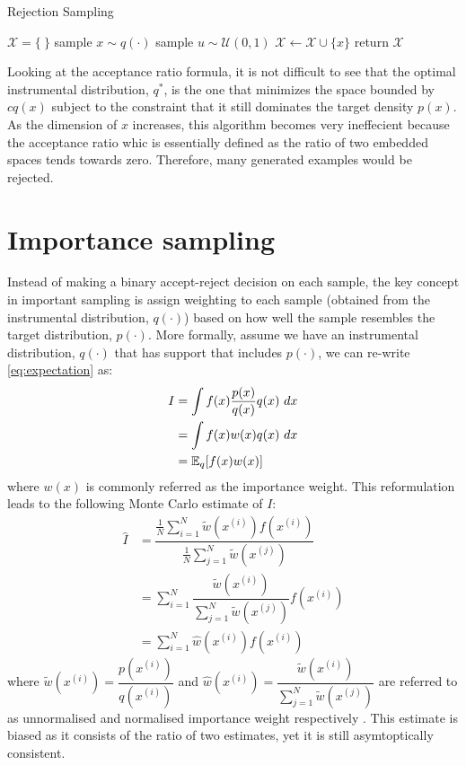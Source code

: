 \begin{algorithm}
\caption{Rejection Sampling}\label{algo:rejectionsampling}
\begin{algorithmic}[1]
\State $\mathcal{X} = \{\ \}$
\Repeat
  \State sample $x \sim q(\cdot)$
  \State sample $u \sim \mathcal{U}(0,1)$
    \State $\mathcal{X} \gets \mathcal{X} \cup \{x\}$
  \EndIf
{}
\State return $\mathcal{X}$
\EndFunction
\end{algorithmic}
\end{algorithm}

Looking at the acceptance ratio formula, it is not difficult to see that the optimal instrumental distribution, $q^*$, is the one that minimizes the space bounded by $cq(x)$ subject to the constraint that it still dominates the target density $p(x)$. As the dimension of $x$ increases, this algorithm becomes very ineffecient because the acceptance ratio whic is essentially defined as the ratio of two embedded spaces tends towards zero. Therefore, many generated examples would be rejected. 

\section{Importance sampling}
\label{sec:IS}
Instead of making a binary accept-reject decision on each sample, the key concept in important sampling is assign weighting to each sample (obtained from the instrumental distribution, $q(\cdot)$) based on how well the sample resembles the target distribution, $p(\cdot)$. More formally, assume we have an instrumental distribution, $q(\cdot)$ that has support that includes $p(\cdot)$, we can re-write \eqref{eq:expectation} as:
\begin{align}
  I &= \int f(x)\dfrac{p(x)}{q(x)}q(x)~dx \nonumber \\
    &= \int f(x)w(x)q(x)~dx \nonumber \\
    &= \operatorname{\mathbb{E}}_q[f(x)w(x)]
\end{align}
where $w(x)$ is commonly referred as the importance weight. This reformulation leads to the following Monte Carlo estimate of $I$:
\begin{align}
  \hat{I} &= \dfrac{\frac{1}{N} \sum^N_{i=1} \tilde{w}(x^{(i)})f(x^{(i)})}{\frac{1}{N} \sum^N_{j=1} \tilde{w}(x^{(j)})} \nonumber \\ 
          &= \sum^N_{i=1} \dfrac{\tilde{w}(x^{(i)})}{\sum^N_{j=1} \tilde{w}(x^{(j)})} f(x^{(i)}) \nonumber \\
          &= \sum^N_{i=1} \hat{w}(x^{(i)}) f(x^{(i)})  \label{eq:is} 
\end{align}
where $\tilde{w}(x^{(i)}) = \dfrac{p(x^{(i)})}{q(x^{(i)})}$ and $\hat{w}(x^{(i)})  = \dfrac{\tilde{w}(x^{(i)})}{\sum^N_{j=1} \tilde{w}(x^{(j)})}$ are referred to as unnormalised and normalised importance weight respectively \cite{CO05}. This estimate is biased as it consists of the ratio of two estimates, yet it is still asymtoptically consistent.

